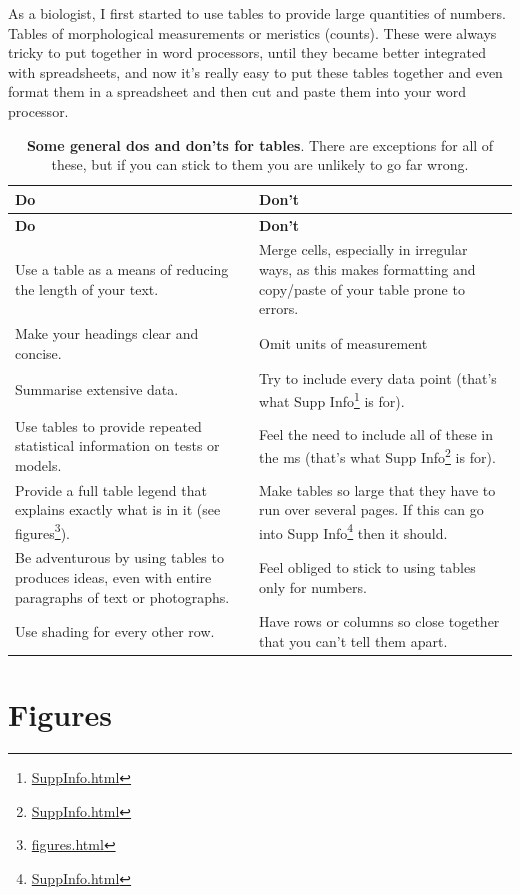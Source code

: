 \documentclass[
]{krantz}
\renewcommand{\href}[2]{#2\footnote{\url{#1}}}
\begin{document}
As a biologist, I first started to use tables to provide large quantities of numbers. Tables of morphological measurements or meristics (counts). These were always tricky to put together in word processors, until they became better integrated with spreadsheets, and now it's really easy to put these tables together and even format them in a spreadsheet and then cut and paste them into your word processor.

\begin{longtable}[]{@{}
  >{\raggedright\arraybackslash}p{}
  >{\raggedright\arraybackslash}p{}@{}}
\caption{\label{tab:tables} \textbf{Some general dos and don'ts for tables}. There are exceptions for all of these, but if you can stick to them you are unlikely to go far wrong.}\tabularnewline
\toprule
\textbf{Do} & \textbf{Don't} \\
\midrule
\endfirsthead
\toprule
\textbf{Do} & \textbf{Don't} \\
\midrule
\endhead
Use a table as a means of reducing the length of your text. & Merge cells, especially in irregular ways, as this makes formatting and copy/paste of your table prone to errors. \\
Make your headings clear and concise. & Omit units of measurement \\
Summarise extensive data. & Try to include every data point (that's what \href{SuppInfo.html}{Supp Info} is for). \\
Use tables to provide repeated statistical information on tests or models. & Feel the need to include all of these in the ms (that's what \href{SuppInfo.html}{Supp Info} is for). \\
Provide a full table legend that explains exactly what is in it (see \href{figures.html}{figures}). & Make tables so large that they have to run over several pages. If this can go into \href{SuppInfo.html}{Supp Info} then it should. \\
Be adventurous by using tables to produces ideas, even with entire paragraphs of text or photographs. & Feel obliged to stick to using tables only for numbers. \\
Use shading for every other row. & Have rows or columns so close together that you can't tell them apart. \\
\bottomrule
\end{longtable}

\hypertarget{figures}{%
\section{Figures}\label{figures}}
\end{document}
